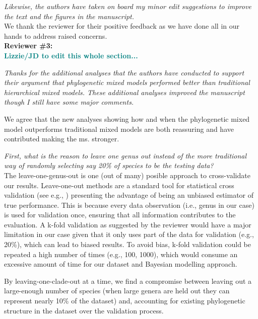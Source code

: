 \documentclass[11pt]{article}
\begin{document}
\emph{Likewise, the authors have taken on board my minor edit suggestions to improve the text and the figures in the manuscript.}\\

We thank the reviewer for their positive feedback as we have done all in our hands to address raised concerns.\\

{\bf Reviewer \#3:}\\ \textcolor{teal}{{\bf Lizzie/JD to edit this whole section...}}


\emph{Thanks for the additional analyses that the authors have conducted to support their argument that phylogenetic mixed models performed better than traditional hierarchical mixed models. These additional analyses improved the manuscript though I still have some major comments.}

We agree that the new analyses showing how and when the phylogenetic mixed model outperforms traditional mixed models are both reassuring and have contributed making the ms. stronger.


\emph{First, what is the reason to leave one genus out instead of the more traditional way of randomly selecting say 20\% of species to be the testing data? }\\



The leave-one-genus-out is one (out of many) posible approach to cross-validate our results. Leave-one-out methods are a standard tool for statistical cross validation (see e.g., ) presenting the advantage of being an unbiased estimator of true performance. This is because every data observation (i.e., genus in our case) is used for validation once, ensuring that all information contributes to the evaluation. A k-fold validation as suggested by the reviewer would have a major limitation in our case given that it only uses part of the data for validation (e.g., 20\%), which can lead to biased results. To avoid bias, k-fold validation could be repeated a high number of times (e.g., 100, 1000), which would consume an excessive amount of time for our dataset and Bayesian modelling approach.

By leaving-one-clade-out at a time, we find a compromise between leaving out a large-enough number of species (when large genera are held out they can represent nearly 10\% of the dataset) and, accounting for existing phylogenetic structure in the dataset over the validation process.\\
\end{document}
